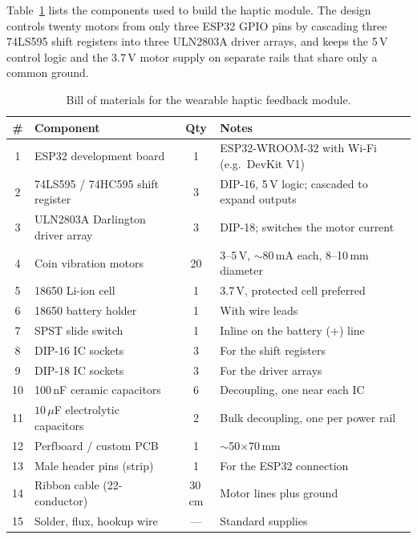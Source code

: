 Table~\ref{tab:haptic_bom} lists the components used to build the haptic module. The design controls twenty motors from only three ESP32 GPIO pins by cascading three 74LS595 shift registers into three ULN2803A driver arrays, and keeps the 5\,V control logic and the 3.7\,V motor supply on separate rails that share only a common ground.

\begin{table}[H]
\centering
\begin{tabular}{|c|p{}|c|p{}|}
\hline
\textbf{\#} & \textbf{Component} & \textbf{Qty} & \textbf{Notes} \\
\hline
1 & ESP32 development board & 1 & ESP32-WROOM-32 with Wi-Fi (e.g.\ DevKit V1) \\
\hline
2 & 74LS595 / 74HC595 shift register & 3 & DIP-16, 5\,V logic; cascaded to expand outputs \\
\hline
3 & ULN2803A Darlington driver array & 3 & DIP-18; switches the motor current \\
\hline
4 & Coin vibration motors & 20 & 3--5\,V, $\sim$80\,mA each, 8--10\,mm diameter \\
\hline
5 & 18650 Li-ion cell & 1 & 3.7\,V, protected cell preferred \\
\hline
6 & 18650 battery holder & 1 & With wire leads \\
\hline
7 & SPST slide switch & 1 & Inline on the battery (+) line \\
\hline
8 & DIP-16 IC sockets & 3 & For the shift registers \\
\hline
9 & DIP-18 IC sockets & 3 & For the driver arrays \\
\hline
10 & 100\,nF ceramic capacitors & 6 & Decoupling, one near each IC \\
\hline
11 & $10\,\mu$F electrolytic capacitors & 2 & Bulk decoupling, one per power rail \\
\hline
12 & Perfboard / custom PCB & 1 & $\sim$50$\times$70\,mm \\
\hline
13 & Male header pins (strip) & 1 & For the ESP32 connection \\
\hline
14 & Ribbon cable (22-conductor) & 30\,cm & Motor lines plus ground \\
\hline
15 & Solder, flux, hookup wire & --- & Standard supplies \\
\hline
\end{tabular}
\caption{Bill of materials for the wearable haptic feedback module.}
\label{tab:haptic_bom}
\end{table}

